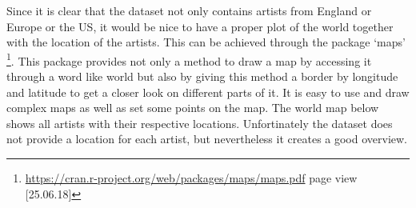 \documentclass[]{article}
\newenvironment{Shaded}{\begin{snugshade}}{\end{snugshade}}
\newcommand{\KeywordTok}[1]{\textcolor[rgb]{0.13,0.29,0.53}{\textbf{#1}}}
\newcommand{\DataTypeTok}[1]{\textcolor[rgb]{0.13,0.29,0.53}{#1}}
\newcommand{\DecValTok}[1]{\textcolor[rgb]{0.00,0.00,0.81}{#1}}
\newcommand{\StringTok}[1]{\textcolor[rgb]{0.31,0.60,0.02}{#1}}
\newcommand{\CommentTok}[1]{\textcolor[rgb]{0.56,0.35,0.01}{\textit{#1}}}
\newcommand{\OtherTok}[1]{\textcolor[rgb]{0.56,0.35,0.01}{#1}}
\newcommand{\OperatorTok}[1]{\textcolor[rgb]{0.81,0.36,0.00}{\textbf{#1}}}
\newcommand{\NormalTok}[1]{#1}
\let\rmarkdownfootnote\footnote%
\def\footnote{\protect\rmarkdownfootnote}
\begin{document}
Since it is clear that the dataset not only contains artists from
England or Europe or the US, it would be nice to have a proper plot of
the world together with the location of the artists. This can be
achieved through the package `maps' \footnote{\url{https://cran.r-project.org/web/packages/maps/maps.pdf}
  page view {[}25.06.18{]}}. This package provides not only a method to
draw a map by accessing it through a word like world but also by giving
this method a border by longitude and latitude to get a closer look on
different parts of it. It is easy to use and draw complex maps as well
as set some points on the map. The world map below shows all artists
with their respective locations. Unfortinately the dataset does not
provide a location for each artist, but nevertheless it creates a good
overview.

\begin{Shaded}
\end{Shaded}
\end{document}
